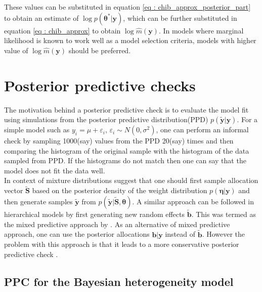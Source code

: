 These values can be substituted in equation \ref{eq : chib_approx_posterior_part} to obtain an estimate of $\log{p(\boldsymbol{\theta}^*|\boldsymbol{y})}$, which can be further substituted in equation \ref{eq : chib_approx} to obtain $\log{\hat{m}(\boldsymbol{y})}$. In models where marginal likelihood is known to work well as a model selection criteria, models with higher value of $\log{\hat{m}(\boldsymbol{y})}$ should be preferred.

\section{Posterior predictive checks}
\label{sec : ppc}
The motivation behind a posterior predictive check is to evaluate the model fit using simulations from the posterior predictive distribution(PPD) $p(\boldsymbol{\tilde{y}}|\boldsymbol{y})$. For a simple model such as $y_i = \mu + \varepsilon_i$, $\varepsilon_i \sim N(0, \sigma^2)$, one can perform an informal check by sampling 1000(say) values from the PPD 20(say) times and then comparing the histogram of the original sample with the histogram of the data sampled from PPD. If the histograms do not match then one can say that the model does not fit the data well.\\

In context of mixture distributions \citet{fruhwirth-schnatter_finite_2013} suggest that one should first sample allocation vector $\boldsymbol{\tilde{S}}$ based on the posterior density of the weight distribution $p(\boldsymbol{\eta}|\boldsymbol{y})$ and then generate samples $\boldsymbol{\tilde{y}}$ from $p(\boldsymbol{\tilde{y}}|\boldsymbol{\tilde{S}}, \boldsymbol{\theta})$. A similar approach can be followed in hierarchical models by first generating new random effects $\boldsymbol{\tilde{b}}$. This was termed as the mixed predictive approach by \citet{marshall_approximate_2003}. As an alternative of mixed predictive approach, one can use the posterior allocations $\boldsymbol{b}|\boldsymbol{y}$ instead of $\boldsymbol{\tilde{b}}$. However the problem with this approach is that it leads to a more conservative posterior predictive check \citep{congdon_applied_2010}.\\

\subsection{PPC for the Bayesian heterogeneity model}
\label{subsec : ppc_bhtge}
